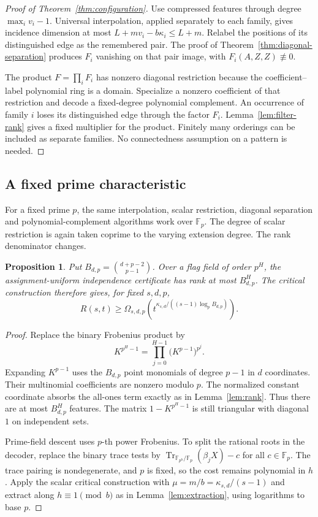 \documentclass[11pt,a4paper]{article}
\newcommand{\F}{\mathbb F}
\DeclareMathOperator{\Tr}{Tr}
\newtheorem{proposition}[theorem]{Proposition}
\theoremstyle{definition}
\theoremstyle{remark}
\numberwithin{equation}{section}
\begin{document}
\begin{proof}[Proof of Theorem~\ref{thm:configuration}]
Use compressed features through degree $\max_i v_i-1$. Universal interpolation, applied separately to each family, gives incidence dimension at most $L+mv_i-b\kappa_i\le L+m$. Relabel the positions of its distinguished edge as the remembered pair. The proof of Theorem~\ref{thm:diagonal-separation} produces $F_i$ vanishing on that pair image, with $F_i(A,Z,Z)\not\equiv0$.

The product $F=\prod_iF_i$ has nonzero diagonal restriction because the coefficient--label polynomial ring is a domain. Specialize a nonzero coefficient of that restriction and decode a fixed-degree polynomial complement. An occurrence of family $i$ loses its distinguished edge through the factor $F_i$. Lemma~\ref{lem:filter-rank} gives a fixed multiplier for the product. Finitely many orderings can be included as separate families. No connectedness assumption on a pattern is needed.
\end{proof}

\subsection{A fixed prime characteristic}
For a fixed prime $p$, the same interpolation, scalar restriction, diagonal separation and polynomial-complement algorithms work over $\F_p$. The degree of scalar restriction is again taken coprime to the varying extension degree. The rank denominator changes.

\begin{proposition}\label{prop:prime}
Put $B_{d,p}=\binom{d+p-2}{p-1}$. Over a flag field of order $p^H$, the assignment-uniform independence certificate has rank at most $B_{d,p}^H$. The critical construction therefore gives, for fixed $s,d,p$,
\[
R(s,t)\ge\Omega_{s,d,p}\left(t^{\kappa_{s,d}/((s-1)\log_p B_{d,p})}\right).
\]
\end{proposition}

\begin{proof}
Replace the binary Frobenius product by
\[
K^{p^H-1}=\prod_{j=0}^{H-1}\bigl(K^{p-1}\bigr)^{p^j}.
\]
Expanding $K^{p-1}$ uses the $B_{d,p}$ point monomials of degree $p-1$ in $d$ coordinates. Their multinomial coefficients are nonzero modulo $p$. The normalized constant coordinate absorbs the all-ones term exactly as in Lemma~\ref{lem:rank}. Thus there are at most $B_{d,p}^H$ features. The matrix $1-K^{p^H-1}$ is still triangular with diagonal $1$ on independent sets.

Prime-field descent uses $p$-th power Frobenius. To split the rational roots in the decoder, replace the binary trace tests by $\Tr_{\F_{p^h}/\F_p}(\beta_jX)-c$ for all $c\in\F_p$. The trace pairing is nondegenerate, and $p$ is fixed, so the cost remains polynomial in $h$. Apply the scalar critical construction with $\mu=m/b=\kappa_{s,d}/(s-1)$ and extract along $h\equiv1\pmod b$ as in Lemma~\ref{lem:extraction}, using logarithms to base $p$.
\end{proof}
\end{document}
